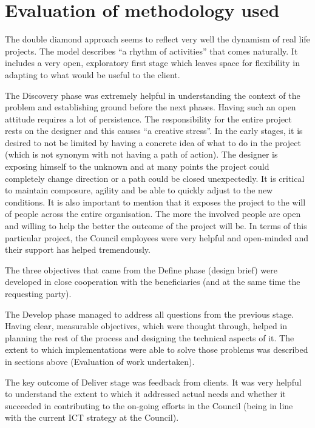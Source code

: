 	\section{Evaluation of methodology used}

The double diamond approach seems to reflect very well the dynamism of real life projects. The model describes “a rhythm of activities” that comes naturally. It includes a very open, exploratory first stage which leaves space for flexibility in adapting to what would be useful to the client.

The Discovery phase was extremely helpful in understanding the context of the problem and establishing ground before the next phases. Having such an open attitude requires a lot of persistence. The responsibility for the entire project rests on the designer and this causes “a creative stress”. In the early stages, it is desired to not be limited by having a concrete idea of what to do in the project (which is not synonym with not having a path of action). The designer is exposing himself to the unknown and at many points the project could completely change direction or a path could be closed unexpectedly. It is critical to maintain composure, agility and be able to quickly adjust to the new conditions. It is also important to mention that it exposes the project to the will of people across the entire organisation. The more the involved people are open and willing to help the better the outcome of the project will be. In terms of this particular project, the Council employees were very helpful and open-minded and their support has helped tremendously.

The three objectives that came from the Define phase (design brief) were developed in close cooperation with the beneficiaries (and at the same time the requesting party).

The Develop phase managed to address all questions from the previous stage. Having clear, measurable objectives, which were thought through, helped in planning the rest of the process and designing the technical aspects of it. The extent to which implementations were able to solve those problems was described in sections above (Evaluation of work undertaken).

The key outcome of Deliver stage was feedback from clients. It was very helpful to understand the extent to which it addressed actual needs and whether it succeeded in contributing to the on-going efforts in the Council (being in line with the current ICT strategy at the Council).